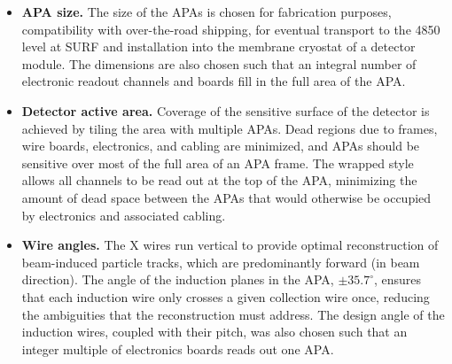 \begin{itemize}
\item \textbf{APA size.} The size of the APAs is chosen for fabrication purposes, compatibility with over-the-road shipping, for eventual transport to the 4850 level at SURF and installation into the membrane cryostat of a detector module. %
The dimensions are also chosen such that an integral number of electronic readout channels and boards fill in the full area of the APA. %

\item \textbf{Detector active area.} Coverage of the sensitive surface of the detector is achieved by tiling the area with multiple APAs. Dead regions due to frames, wire boards, electronics, and cabling are minimized, and APAs should be sensitive over most of the full area of an APA frame. The wrapped style allows all channels to be read out at the top of the APA, minimizing the amount of dead space between the APAs that would otherwise be occupied by electronics and associated cabling.    


\item \textbf{Wire angles.} The X wires run vertical to provide optimal reconstruction of beam-induced particle tracks, which are predominantly forward (in beam direction). The angle of the induction planes in the APA, $\pm35.7^{\circ}$, ensures that each induction wire only crosses a given collection wire once, reducing the ambiguities that the reconstruction must address.  The design angle of the induction wires, coupled with their pitch, was also chosen such that an integer multiple of electronics boards reads out one APA.


\end{itemize}
